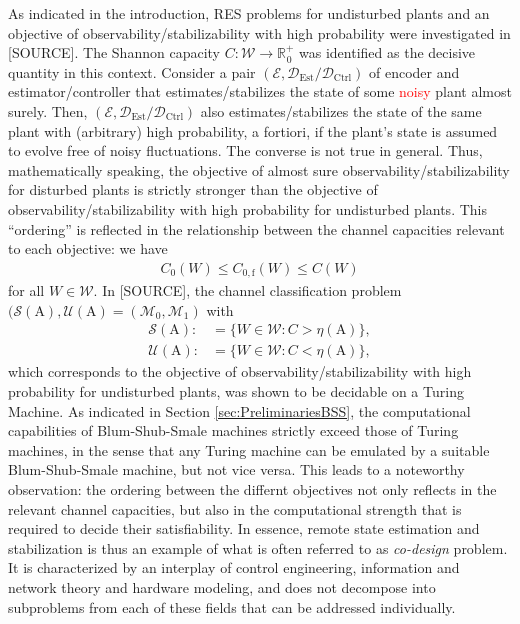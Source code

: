 \documentclass[conference]{IEEEtran}
\def\E{{\mathcal E}}
\def\D{{\mathcal D}}
\def\M{{\mathcal M}}
\def\W{{\mathcal W}}
\def\S{{\mathcal S}}
\def\U{{\mathcal U}}
\def\RR{{\mathbb R}}
\def\mA{\bm{\mathrm{A}}}
\newcommand{\De}{\D_{\text{Est}}}
\newcommand{\Dc}{\D_{\text{Ctrl}}}
\newcommand{\sdummy}{{\color{red}[SOURCE]}}
\begin{document}
	As indicated in the introduction, RES problems for undisturbed plants and an objective of observability/stabilizability with
	high probability were investigated in \sdummy. The Shannon capacity \(C : \W \rightarrow \RR_{\hspace{1pt}0}^{+}\) was identified as the decisive quantity in this context.
	Consider a pair \((\E,\De\text{/}\Dc)\) of encoder and estimator/controller that estimates/stabilizes the state of some \textcolor{red}{noisy} plant almost surely.
	Then, \((\E,\De\text{/}\Dc)\) also estimates/stabilizes the state of the same plant with (arbitrary) high probability, a fortiori, if the plant's state is 
	assumed to evolve free of noisy fluctuations. The converse is not true in general. Thus, mathematically speaking, the objective of almost sure 
	observability/stabilizability for disturbed plants is strictly stronger than the objective of observability/stabilizability with high probability for 
	undisturbed plants. This ``ordering'' is reflected in the relationship between the channel capacities relevant to each objective: we have
	\begin{align}
		C_0(W) \leq C_{0,\mathrm{f}}(W) \leq C(W)
	\end{align}
	for all \(W\in\W\). In \sdummy, the channel classification problem \((\S(\mA),\U(\mA) = (\M_0,\M_1)\) with
	\begin{align}	\S(\mA) :&= \big\{ W \in \W : C > \eta(\mA)\big\}, \\
					\U(\mA) :&= \big\{ W \in \W : C < \eta(\mA)\big\},
	\end{align}
	which corresponds to the objective of observability/stabilizability with high probability for 
	undisturbed plants, was shown to be decidable on a Turing Machine. {\color{red} As indicated in Section \ref{sec:PreliminariesBSS}}, the computational
	capabilities of Blum-Shub-Smale machines strictly exceed those of Turing machines, in the sense that any Turing machine can be emulated by a suitable
	Blum-Shub-Smale machine, but not vice versa. This leads to a noteworthy observation: the ordering between the differnt objectives not only reflects 
	in the relevant channel capacities, but also in the computational strength that is required to decide their satisfiability. 
	In essence, remote state estimation and stabilization is thus an example of what is often referred to as \emph{co-design} problem. It is characterized by
	an interplay of control engineering, information and network theory and hardware modeling, and does not decompose into subproblems from each of these fields
	that can be addressed individually. 	
		



\end{document}
